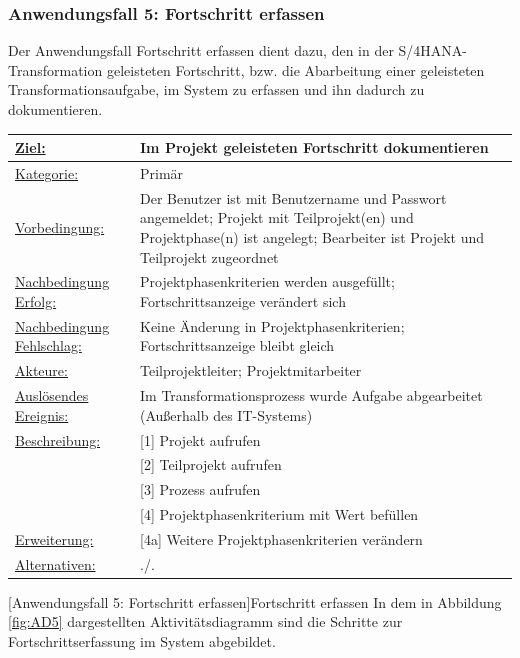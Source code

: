 \newpage
\subsubsection{Anwendungsfall 5: Fortschritt erfassen}
Der Anwendungsfall \glqq{}Fortschritt erfassen\grqq{} dient dazu, den in der S/4HANA-Transformation geleisteten Fortschritt, bzw. die Abarbeitung einer geleisteten Transformationsaufgabe, im System zu erfassen und ihn dadurch zu dokumentieren.\\

\begin{tabularx}{\textwidth}{|p{}|p{}|}
        \hline
        \underline{Ziel:} & Im Projekt geleisteten Fortschritt dokumentieren \\\hline
        \underline{Kategorie:} & Primär \\\hline
        \underline{Vorbedingung:} & Der Benutzer ist mit Benutzername und Passwort angemeldet; Projekt mit Teilprojekt(en) und Projektphase(n) ist angelegt; Bearbeiter ist Projekt und Teilprojekt zugeordnet \\\hline
        \underline{Nachbedingung Erfolg:} & Projektphasenkriterien werden ausgefüllt; Fortschrittsanzeige verändert sich \\\hline
        \underline{Nachbedingung Fehlschlag:} & Keine Änderung in Projektphasenkriterien; Fortschrittsanzeige bleibt gleich \\\hline
        \underline{Akteure:} & Teilprojektleiter; Projektmitarbeiter \\\hline
        \underline{Auslösendes Ereignis:} & Im Transformationsprozess wurde Aufgabe abgearbeitet (Außerhalb des IT-Systems)\\\hline        
        \multirow{1}{*}{\underline{Beschreibung:}} & [1] Projekt aufrufen \\
        & [2] Teilprojekt aufrufen \\
        & [3] Prozess aufrufen \\
        & [4] Projektphasenkriterium mit Wert befüllen \\\hline
        \multirow{1}{*}{\underline{Erweiterung:}} & [4a] Weitere Projektphasenkriterien verändern \\\hline
        \underline{Alternativen:} & ./. \\\hline
\end{tabularx}
[Anwendungsfall 5: Fortschritt erfassen]{Fortschritt erfassen}
\newpage
In dem in Abbildung \ref{fig:AD5} dargestellten Aktivitätsdiagramm sind die Schritte zur Fortschrittserfassung im System abgebildet.
